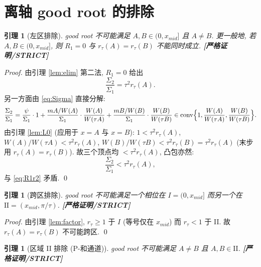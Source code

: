 \documentclass[UTF8]{ctexart}
\newtheorem{lemma}[theorem]{引理}
\newcommand{\STRICT}{\textbf{[严格证明/STRICT]}}
\begin{document}
\section{离轴 good root 的排除}\label{sec:excl}

\begin{lemma}[左区排除]\label{lem:L3}
	good root 不可能满足 $A,B\in(0,x_{mid}]$ 且 $A\ne B$.
	更一般地, 若 $A,B\in(0,x_{mid}]$, 则 $R_1=0$ 与 $r_\tau(A)=r_\tau(B)$
	不能同时成立. \STRICT{}
\end{lemma}

\begin{proof}
	由引理 \ref{lem:elim} 第二法, $R_1=0$ 给出
	\begin{equation}
		\frac{\Sigma_2}{\Sigma_1}=\tau^2r_\tau(A).
		\label{eq:R1r2}
	\end{equation}
	另一方面由 \eqref{eq:Sigma} 直接分解:
	\begin{equation}
		\frac{\Sigma_2}{\Sigma_1}
		=\frac{\psi}{\Sigma_1}\cdot 1
		+\frac{mA/W(A)}{\Sigma_1}\cdot\frac{W(A)}{W(\tau A)}
		+\frac{mB/W(B)}{\Sigma_1}\cdot\frac{W(B)}{W(\tau B)}
		\in\operatorname{conv}\Bigl\{1,\frac{W(A)}{W(\tau A)},\frac{W(B)}{W(\tau B)}\Bigr\}.
		\label{eq:conv}
	\end{equation}
	由引理 \ref{lem:L0} (应用于 $x=A$ 与 $x=B$):
	$1<\tau^2r_\tau(A)$, $W(A)/W(\tau A)<\tau^2r_\tau(A)$,
	$W(B)/W(\tau B)<\tau^2r_\tau(B)=\tau^2r_\tau(A)$ (末步用 $r_\tau(A)=r_\tau(B)$).
	故三个顶点均 $<\tau^2r_\tau(A)$, 凸包亦然:
	\begin{equation}
		\frac{\Sigma_2}{\Sigma_1}<\tau^2r_\tau(A),
	\end{equation}
	与 \eqref{eq:R1r2} 矛盾. \qed
\end{proof}

\begin{lemma}[跨区排除]\label{lem:cross}
	good root 不可能满足一个相位在 $I=(0,x_{mid}]$ 而另一个在
	$\mathrm{II}=(x_{mid},\pi/\tau)$. \STRICT{}
\end{lemma}

\begin{proof}
	由引理 \ref{lem:factor}, $r_\tau\ge1$ 于 $I$ (等号仅在 $x_{mid}$) 而
	$r_\tau<1$ 于 II. 故 $r_\tau(A)=r_\tau(B)$ 不可能跨区. \qed
\end{proof}

\begin{lemma}[区域 II 排除 (P-和通道)]\label{lem:psum}
	good root 不可能满足 $A\ne B$ 且 $A,B\in\mathrm{II}$. \STRICT{}
\end{lemma}
\end{document}

